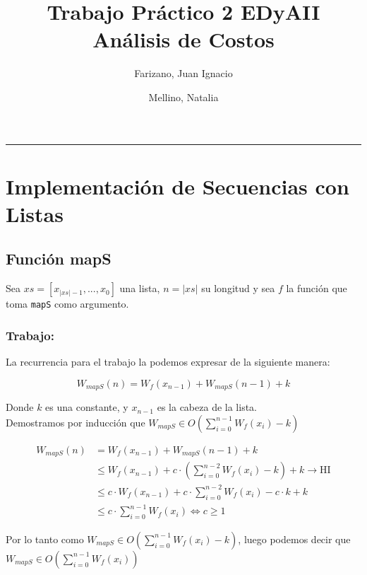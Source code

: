 \documentclass[11pt]{article}
\title{Trabajo Práctico 2 EDyAII \\
        \large Análisis de Costos
}
\author{Farizano, Juan Ignacio \and Mellino, Natalia}
\date{}
\begin{document}
\maketitle

\noindent\rule{\textwidth}{1pt}
\section{Implementación de Secuencias con Listas}


\subsection{Función mapS}
Sea $xs = [x_{\vert xs \vert -1},...,x_0]$ una lista, $n = \vert xs \vert$ su longitud
y sea $f$ la función que toma \texttt{mapS} como argumento. 

\subsubsection{Trabajo:}
La recurrencia para el trabajo la podemos expresar de la siguiente manera:

\begin{equation*}
    W_{mapS}(n) = W_f(x_{n- 1}) + W_{mapS}(n - 1) + k
\end{equation*}

Donde $k$ es una constante, y $x_{n - 1}$ es la cabeza de la lista. \\

Demostramos por inducción que $ W_{mapS} \in O\left(\displaystyle\sum_{i=0}^{n - 1}W_f(x_i) - k\right) $

\begin{align*}
    W_{mapS}(n) & = W_f(x_{n - 1}) + W_{mapS}(n - 1) + k \\
               & \leq W_f(x_{n - 1}) + c \cdot \left(\displaystyle\sum_{i=0}^{n - 2}W_f(x_i) - k\right) + k \rightarrow \text{HI} \\
               & \leq c \cdot  W_f(x_{n - 1}) + c \cdot \displaystyle\sum_{i=0}^{n - 2}W_f(x_i) - c \cdot k + k \\
               & \leq c \cdot \displaystyle\sum_{i=0}^{n - 1}W_f(x_i) \iff c \geq 1
\end{align*}

Por lo tanto como $ W_{mapS} \in O\left(\displaystyle\sum_{i=0}^{n - 1}W_f(x_i) - k\right) $,
luego podemos decir que $ W_{mapS} \in O\left(\displaystyle\sum_{i=0}^{n - 1}W_f(x_i)\right) $
\end{document}
